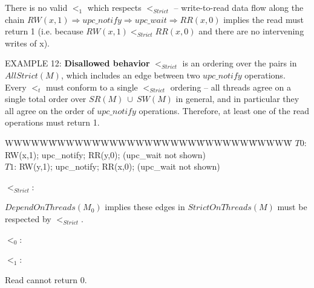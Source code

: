 \documentclass[12pt,titlepage]{article}
\newcounter{parnum}
\newcommand\np{\addtocounter{parnum}{1}\hspace{-2em}\makebox[2em][l]{\arabic{parnum}}}
\begin{document}
\bigskip
There is no valid $<_1$ which respects $<_{Strict}$ -- write-to-read data flow
along the chain $RW(x,1) \Rightarrow upc\_notify \Rightarrow upc\_wait \Rightarrow RR(x,0)$
implies the read must return 1 (i.e. because $RW(x,1) <_{Strict} RR(x,0)$ and there are no 
intervening writes of x).

\bigskip
\np EXAMPLE 12: \textbf{Disallowed behavior} 
$<_{Strict}$ is an ordering over the pairs in $AllStrict(M)$, which 
includes an edge between two $upc\_notify$ operations. Every $<_t$ must conform
to a single $<_{Strict}$ ordering -- all threads agree on a single total
order over $SR(M)\ \cup\ SW(M)$ in general, and in particular they all agree
on the order of $upc\_notify$ operations. Therefore, at least one of the
read operations must return 1.

\begin{tabbing}WWWWW\=WWWWW\=WWWWWWW\=WWWWW\=WWWWWW\=WWWWW\=\kill
$T0$: \> RW(x,1); \> upc\_notify; \> RR(y,0); \> (upc\_wait not shown)\\
$T1$: \> RW(y,1); \> upc\_notify; \> RR(x,0); \> (upc\_wait not shown)\\
\end{tabbing}

\bigskip
$<_{Strict}$:\\
\hspace{0.1in}
\parbox[t]{3in}
{$DependOnThreads(M_0)$ implies these edges in $StrictOnThreads(M)$ must be 
respected by $<_{Strict}$.\footnotemark}

\bigskip
$<_0$:\hspace{0.25in}
\hspace{0.4in}
\parbox[t]{2.5in}
{}

\bigskip
$<_1$:\hspace{0.25in}
\hspace{0.25in}
\parbox[t]{2in}
{ \vspace{0.5in} Read cannot return 0. }
\end{document}
